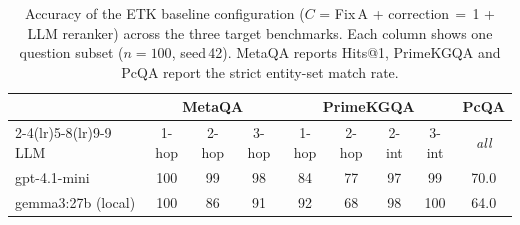 %
\begin{table}[t]
\centering
\small
\caption{Accuracy of the ETK baseline configuration ($C$ = Fix\,A + correction\,$=$\,1 + LLM reranker) across the three target benchmarks. Each column shows one question subset ($n=100$, seed\,42). MetaQA reports Hits@1, PrimeKGQA and PcQA report the strict entity-set match rate.}
\label{tab:main_results}
\begin{tabular}{l ccc cccc c}
\toprule
 & \multicolumn{3}{c}{\textbf{MetaQA}} & \multicolumn{4}{c}{\textbf{PrimeKGQA}} & \textbf{PcQA} \\
\cmidrule(lr){2-4}\cmidrule(lr){5-8}\cmidrule(lr){9-9}
LLM & 1-hop & 2-hop & 3-hop & 1-hop & 2-hop & 2-int & 3-int & \textit{all} \\
\midrule
gpt-4.1-mini        & 100 & 99 & 98 & 84 & 77 & 97 & 99 & 70.0 \\
gemma3:27b (local)  & 100 & 86 & 91 & 92 & 68 & 98 & 100 & 64.0 \\
\bottomrule
\end{tabular}
\end{table}
